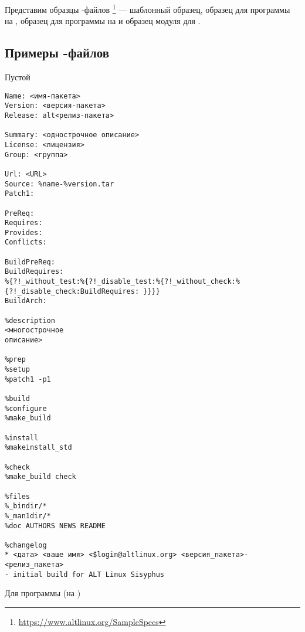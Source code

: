 Представим образцы -файлов%
\footnote{\href{https://www.altlinux.org/SampleSpecs}{https://www.altlinux.org/SampleSpecs}} 
--- шаблонный образец, образец для программы на , образец для программы на 
 и образец модуля для .

\subsection*{Примеры -файлов}

 Пустой 
\begin{Verbatim}[breaklines=true,breakanywhere=true,fontsize=\scriptsize]
Name: <имя-пакета>
Version: <версия-пакета>
Release: alt<релиз-пакета>
	
Summary: <однострочное описание>
License: <лицензия>
Group: <группа>

Url: <URL>
Source: %name-%version.tar
Patch1:
	
PreReq:
Requires:
Provides:
Conflicts:
	
BuildPreReq:
BuildRequires:
%{?!_without_test:%{?!_disable_test:%{?!_without_check:%{?!_disable_check:BuildRequires: }}}}
BuildArch:
	
%description
<многострочное
описание>
	
%prep
%setup
%patch1 -p1

%build
%configure
%make_build
		
%install
%makeinstall_std
	
%check
%make_build check
		
%files
%_bindir/*
%_man1dir/*
%doc AUTHORS NEWS README
		
%changelog
* <дата> <ваше имя> <$login@altlinux.org> <версия_пакета>-<релиз_пакета>
- initial build for ALT Linux Sisyphus
\end{Verbatim}

 Для программы (на )
	
